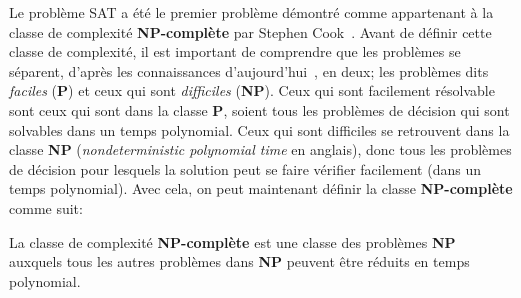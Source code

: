 Le problème SAT a été le premier problème démontré comme appartenant à la classe de complexité \textbf{NP-complète} par Stephen Cook~\cite{cook1971}.
Avant de définir cette classe de complexité, il est important de comprendre que les problèmes se séparent, d'après les connaissances d'aujourd'hui~\cite{millenniumPrizeProblems}, en deux; les problèmes dits \emph{faciles} (\textbf{P}) et ceux qui sont \emph{difficiles} (\textbf{NP}).
Ceux qui sont facilement résolvable sont ceux qui sont dans la classe \textbf{P}, soient tous les problèmes de décision qui sont solvables dans un temps polynomial.
Ceux qui sont difficiles se retrouvent dans la classe \textbf{NP} (\textit{nondeterministic polynomial time} en anglais), donc tous les problèmes de décision pour lesquels la solution peut se faire vérifier facilement (dans un temps polynomial).
Avec cela, on peut maintenant définir la classe \textbf{NP-complète} comme suit:
\begin{definition}\label{def:NP-complete}
    La classe de complexité \textbf{NP-complète} est une classe des problèmes \textbf{NP} auxquels tous les autres problèmes dans \textbf{NP} peuvent être réduits en temps polynomial.
\end{definition}
